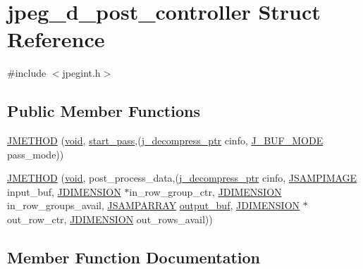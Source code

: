\hypertarget{structjpeg__d__post__controller}{}\section{jpeg\+\_\+d\+\_\+post\+\_\+controller Struct Reference}
\label{structjpeg__d__post__controller}


{\ttfamily \#include $<$jpegint.\+h$>$}

\subsection*{Public Member Functions}
\begin{DoxyCompactItemize}
\item 
\hyperlink{structjpeg__d__post__controller_a349b2ff7508568d13a9294f3e79163aa}{J\+M\+E\+T\+H\+O\+D} (\hyperlink{png_8h_aa8c59027f9ab2769342f248709d68d17}{void}, \hyperlink{jddctmgr_8c_a1964f006adb8fb80f57e455f6452aec1}{start\+\_\+pass},(\hyperlink{jpeglib_8h_a00c7d78af44bd26a901c791ccfc1e178}{j\+\_\+decompress\+\_\+ptr} cinfo, \hyperlink{jpegint_8h_a1f0803342372ac62b6903c399399c874}{J\+\_\+\+B\+U\+F\+\_\+\+M\+O\+D\+E} pass\+\_\+mode))
\item 
\hyperlink{structjpeg__d__post__controller_adb337adcfe3a314ceac4b626a73d87c3}{J\+M\+E\+T\+H\+O\+D} (\hyperlink{png_8h_aa8c59027f9ab2769342f248709d68d17}{void}, post\+\_\+process\+\_\+data,(\hyperlink{jpeglib_8h_a00c7d78af44bd26a901c791ccfc1e178}{j\+\_\+decompress\+\_\+ptr} cinfo, \hyperlink{jpeglib_8h_a4bf858e4d42202287e786bdec2f3b62b}{J\+S\+A\+M\+P\+I\+M\+A\+G\+E} input\+\_\+buf, \hyperlink{jmorecfg_8h_a04ed4674f6f1d0d50ec241531e38274f}{J\+D\+I\+M\+E\+N\+S\+I\+O\+N} $\ast$in\+\_\+row\+\_\+group\+\_\+ctr, \hyperlink{jmorecfg_8h_a04ed4674f6f1d0d50ec241531e38274f}{J\+D\+I\+M\+E\+N\+S\+I\+O\+N} in\+\_\+row\+\_\+groups\+\_\+avail, \hyperlink{jpeglib_8h_ac9d5d1b829ed51769db69a37271a7e91}{J\+S\+A\+M\+P\+A\+R\+R\+A\+Y} \hyperlink{jdct_8h_ad7e4660a191b1a791748dd44d5a7a0ec}{output\+\_\+buf}, \hyperlink{jmorecfg_8h_a04ed4674f6f1d0d50ec241531e38274f}{J\+D\+I\+M\+E\+N\+S\+I\+O\+N} $\ast$out\+\_\+row\+\_\+ctr, \hyperlink{jmorecfg_8h_a04ed4674f6f1d0d50ec241531e38274f}{J\+D\+I\+M\+E\+N\+S\+I\+O\+N} out\+\_\+rows\+\_\+avail))
\end{DoxyCompactItemize}


\subsection{Member Function Documentation}
\hypertarget{structjpeg__d__post__controller_a349b2ff7508568d13a9294f3e79163aa}{}
